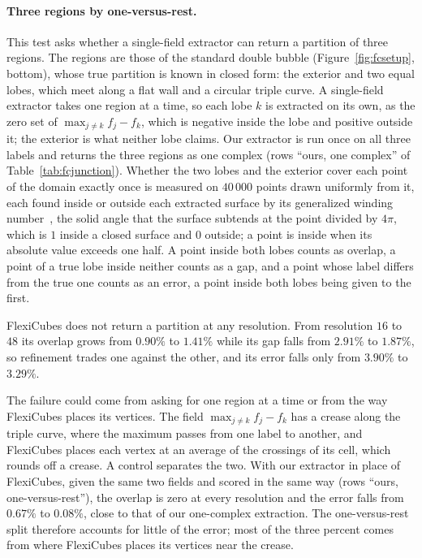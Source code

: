 \documentclass[11pt]{article}
\theoremstyle{definition}
\begin{document}
\paragraph*{Three regions by one-versus-rest.} This test asks whether a
single-field extractor can return a partition of three regions. The regions
are those of the standard double bubble (Figure~\ref{fig:fcsetup}, bottom),
whose true partition is known in closed form: the exterior and two equal
lobes, which meet along a flat wall and a circular triple curve. A
single-field extractor takes one region at a time,
so each lobe $k$ is extracted on its own, as the zero set of
$\max_{j\neq k} f_j - f_k$, which is negative inside the lobe and positive
outside it; the exterior is what neither lobe claims. Our extractor is run
once on all three labels and returns the three regions as
one complex (rows ``ours, one complex'' of Table~\ref{tab:fcjunction}).
Whether the two lobes
and the exterior cover each point of the domain exactly once is measured on
$40\,000$ points drawn uniformly from it, each found inside or outside each
extracted surface by its generalized winding number~\cite{jacobson2013}, the
solid angle that the surface subtends at the point divided by $4\pi$, which
is $1$ inside a closed surface and $0$ outside; a point is inside when its
absolute value exceeds one half. A point inside both lobes counts as overlap,
a point of a true lobe inside neither counts as a gap, and a point whose
label differs from the true one counts as an error, a point inside both
lobes being given to the first.

FlexiCubes does not return a partition at any resolution. From resolution $16$ to $48$ its overlap grows
from $0.90\%$ to $1.41\%$ while its gap falls from $2.91\%$ to $1.87\%$, so
refinement trades one against the other, and its error falls only from
$3.90\%$ to $3.29\%$.

The failure could come from asking for one region at a time or from the way
FlexiCubes places its vertices. The field $\max_{j\neq k} f_j - f_k$ has a
crease along the triple curve, where the maximum passes from one label to
another, and FlexiCubes places each vertex at an average of the crossings of
its cell, which rounds off a crease. A control separates the two. With our
extractor in place of FlexiCubes, given the same two fields and scored in the
same way (rows ``ours, one-versus-rest''), the overlap is zero at every
resolution and the error falls from $0.67\%$ to $0.08\%$, close to that of
our one-complex extraction. The one-versus-rest split therefore accounts for
little of the error; most of the three percent comes from where FlexiCubes
places its vertices near the crease.
\end{document}
